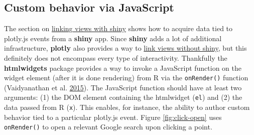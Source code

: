 \documentclass[12pt,]{isuthesis}
\newenvironment{Shaded}{\begin{snugshade}}{\end{snugshade}}
\newcommand{\KeywordTok}[1]{\textcolor[rgb]{0.13,0.29,0.53}{\textbf{{#1}}}}
\newcommand{\DataTypeTok}[1]{\textcolor[rgb]{0.13,0.29,0.53}{{#1}}}
\newcommand{\StringTok}[1]{\textcolor[rgb]{0.31,0.60,0.02}{{#1}}}
\newcommand{\NormalTok}[1]{{#1}}
\begin{document}
\subsection{Custom behavior via
JavaScript}\label{custom-behavior-via-javascript}

The section on \protect\hyperlink{linking-views-with-shiny}{linking
views with shiny} shows how to acquire data tied to plotly.js events
from a \textbf{shiny} app. Since \textbf{shiny} adds a lot of additional
infrastructure, \textbf{plotly} also provides a way to
\protect\hyperlink{linking-views-without-shiny}{link views without
shiny}, but this definitely does not encompass every type of
interactivity. Thankfully the \textbf{htmlwidgets} package provides a
way to invoke a JavaScript function on the widget element (after it is
done rendering) from R via the \texttt{onRender()} function
(Vaidyanathan et al. \protect\hyperlink{ref-htmlwidgets}{2015}). The
JavaScript function should have at least two arguments: (1) the DOM
element containing the htmlwidget (\texttt{el}) and (2) the data passed
from R (\texttt{x}). This enables, for instance, the ability to author
custom behavior tied to a particular plotly.js event. Figure
\ref{fig:click-open} uses \texttt{onRender()} to open a relevant Google
search upon clicking a point.

\begin{Shaded}
\end{Shaded}
\end{document}
